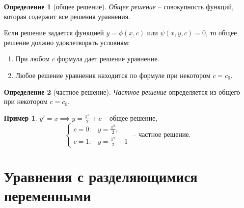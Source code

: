\documentclass[11pt,a4paper,oneside]{report}
\theoremstyle{definition}
\newtheorem{definition}{Определение}[section]
\newtheorem{example}{Пример}
\theoremstyle{plain}
\theoremstyle{remark}
\begin{document}
\begin{definition}[общее решение]
    \emph{Общее решение} -- совокупность функций, которая содержит все решения уравнения.

    Если решение задается функцией $y = \phi(x,c)$ или $\psi(x,y,c) = 0$, то общее решение должно удовлетворять условиям:
    \begin{enumerate}
        \item При любом $c$ формула дает решение уравнение.
        \item Любое решение уравнения находится по формуле при некотором $c = c_0$.
    \end{enumerate}
\end{definition}

\begin{definition}[частное решение]
    \emph{Частное решение} определяется из общего при некотором $c = c_0$.
\end{definition}

\begin{example}
    $y'=x \implies y = \frac{x^2}{2}+c$ -- общее решение,
    \begin{equation*}
        \left\{\begin{array}{ll}
            c=0: & y = \frac{x^2}{2},  \\
            c=1: & y=\frac{x^2}{2} + 1
        \end{array}\right.\text{ -- частное решение}.
    \end{equation*}
\end{example}

\section{Уравнения с разделяющимися переменными}
\end{document}
